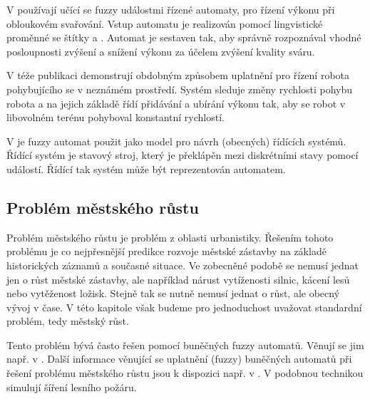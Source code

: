 
V \cite{TzaRig-StaAnaAdaFuzzConSysUsiPetrNetLeaAut} používají učící se fuzzy událostmi řízené automaty, pro řízení výkonu při obloukovém svařování. Vstup automatu je realizován pomocí lingvistické proměnné  se štítky  a . Automat je sestaven tak, aby správně rozpoznával vhodné posloupnosti zvýšení a snížení výkonu za účelem zvýšení kvality sváru. 

V téže publikaci demonstrují obdobným způsobem uplatnění pro řízení robota pohybujícího se v neznámém prostředí. Systém sleduje změny rychlosti pohybu robota a na jejich základě řídí přidávání a ubírání výkonu tak, aby se robot v libovolném terénu pohyboval konstantní rychlostí.

V \cite{WeeFu-FormFuzAutAppModLeaSys, GraFod-FuzAutIntHybConSys} je fuzzy automat použit jako model pro návrh (obecných) řídících systémů. Řídící systém je stavový stroj, který je překlápěn mezi diskrétními stavy pomocí událostí. Řídící tak systém může být reprezentován automatem.

\subsection{Problém městského růstu} \label{subs:UrbGrow}
Problém městského růstu je problém z oblasti urbanistiky. Řešením tohoto problému je co nejpřesnější predikce rozvoje městské zástavby na základě historických záznamů a současné situace. Ve zobecněné podobě se nemusí jednat jen o růst městské zástavby, ale například nárust vytíženosti silnic, kácení lesů nebo vytěženost ložisk. Stejně tak se nutně nemusí jednat o růst, ale obecný vývoj v čase. V této kapitole však budeme pro jednoduchost uvažovat standardní problém, tedy městský růst.

Tento problém bývá často řešen pomocí buněčných fuzzy automatů. Věnují se jim např. v \cite{AlAhHep+-ModUrbGroDynUsCelAutGIS, Ahm+-CalFuzCelAutModUrbDynSauAr, War+-StoConCelModUrbGro, WhiEng-CelAutBasIntDynRegMod, LaiDraSch-IntMulEvCelAutMetLanSimMod, ManHatPra-FuzCelAutBasSheModUrGro+, ManHatPra-ModUrbGroUsFuzCelAut, Wu-CalStoCelAutAppRurUrbLanConv}. %
%
Další informace věnující se uplatnění (fuzzy) buněčných automatů při řešení problému městského růstu jsou k dispozici např. v \cite{PowSimWhi-HieFuzzPattMatcRegCompLanUseMap, Dra-CouFuzSetTheGisBaCelAutLanUseChaMod, WasPar-PreSpaDisEleEnCon+, LiuPhi-DevCelAutModUrbGroIncFuzSetApp}. V \cite{MraZimLapBaj-FuzCelAut+} podobnou technikou simulují šíření lesního požáru.

